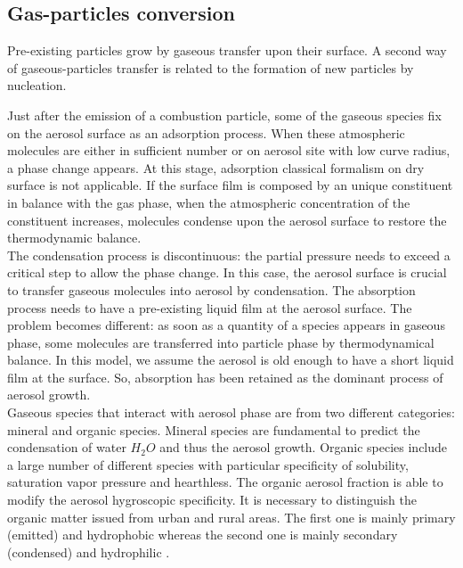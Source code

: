 \subsection{Gas-particles conversion}

Pre-existing particles grow by gaseous transfer upon their surface. A second way 
of gaseous-particles transfer is related to the formation of new particles by 
nucleation.

Just after the emission of a combustion particle, some of the gaseous species 
fix on the aerosol surface as an adsorption process. When these atmospheric 
molecules are either in sufficient number or on aerosol site with low curve 
radius, a phase change appears. At this stage, adsorption classical formalism on
dry surface is not applicable. If the surface film is composed by an unique 
constituent in balance with the gas phase, when the atmospheric concentration of 
the constituent increases,
molecules condense upon the aerosol surface to restore
the thermodynamic balance.\\
The condensation process is discontinuous: the partial pressure needs to exceed 
a critical step to allow the phase change. In this case, the aerosol 
surface is crucial to transfer gaseous molecules into aerosol by condensation.
The absorption process needs to have a pre-existing liquid film at the aerosol 
surface.
The problem becomes different: as soon as a quantity of a species appears in 
gaseous
phase, some molecules are transferred into particle phase by thermodynamical 
balance. In this model, we assume the aerosol is old enough to have a short
liquid film at the surface. 
So, absorption has been retained as the dominant process
of aerosol growth.\\
Gaseous species that interact with aerosol phase are from two different 
categories: mineral and organic species. Mineral species are fundamental to 
predict the condensation of water $H_2O$ and thus the aerosol growth.
Organic species include a large number of different 
species with particular specificity of solubility, saturation vapor pressure and hearthless.
The organic aerosol fraction is able to modify the aerosol hygroscopic 
specificity. It is necessary to distinguish the organic matter issued from urban 
and rural areas. The first one  is mainly primary (emitted) and hydrophobic 
whereas the second one is mainly secondary (condensed) and hydrophilic 
\citep{Saxena1986}.

